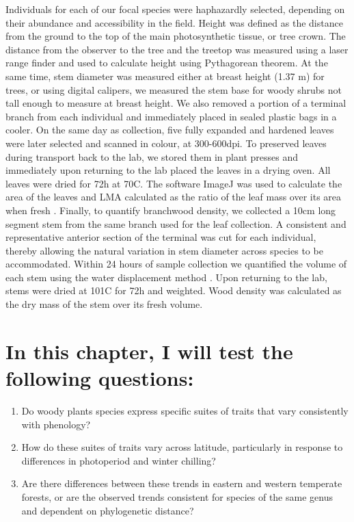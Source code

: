 \documentclass[11pt,a4paper,oneside]{article}
\begin{document}
\par Individuals for each of our focal species were haphazardly selected, depending on their abundance and accessibility in the field. Height was defined as the distance from the ground to the top of the main photosynthetic tissue, or tree crown. The distance from the observer to the tree and the treetop was measured using a laser range finder and used to calculate height using Pythagorean theorem. At the same time, stem diameter was measured either at breast height (1.37 m) for trees, or using digital calipers, we measured the stem base for woody shrubs not tall enough to measure at breast height.  We also removed a portion of a terminal branch from each individual and immediately placed in sealed plastic bags in a cooler. On the same day as collection, five fully expanded and hardened leaves were later selected and scanned in colour, at 300-600dpi. To preserved leaves during transport back to the lab, we stored them in plant presses and immediately upon returning to the lab placed the leaves in a drying oven. All leaves were dried for 72h at 70C. The software ImageJ was used to calculate the area of the leaves and LMA calculated as the ratio of the leaf mass over its area when fresh \cite{Perez-Harguindeguy2013}. Finally, to quantify branchwood density, we collected a 10cm long segment stem from the same branch used for the leaf collection. A consistent and representative anterior section of the terminal was cut for each individual, thereby allowing the natural variation in stem diameter across species to be accommodated. Within 24 hours of sample collection we quantified the volume of each stem using the water displacement method \cite{Perez-Harguindeguy2013}. Upon returning to the lab, stems were dried at 101C for 72h and weighted. Wood density was calculated as the dry mass of the stem over its fresh volume.  


\section*{In this chapter, I will test the following questions:}
\begin{enumerate}
\item Do woody plants species express specific suites of traits that vary consistently with phenology? 
\item How do these suites of traits vary across latitude, particularly in response to differences in photoperiod and winter chilling?
\item Are there differences between these trends in eastern and western temperate forests, or are the observed trends consistent for species of the same genus and dependent on phylogenetic distance?

\end{enumerate}
\par %
\end{document}

